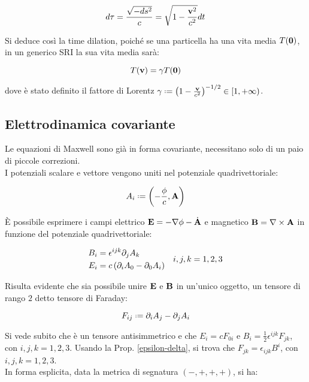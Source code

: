 \begin{equation}
	d \tau = \frac{\sqrt{-ds^2}}{c} = \sqrt{1 - \frac{\mathbf{v}^2}{c^2}} dt
	\label{eq:2.19}
\end{equation}

Si deduce così la time dilation, poiché se una particella ha una vita media $ T(\mathbf{0}) $, in un generico SRI la sua vita media sarà:

\begin{equation}
	T(\mathbf{v}) = \gamma T(\mathbf{0})
	\label{eq:2.20}
\end{equation}

dove è stato definito il fattore di Lorentz $ \gamma \defeq \left(1 - \frac{\ve{v}}{c^2}\right)^{-1/2} \in [1, +\infty) $.

\subsection{Elettrodinamica covariante}

Le equazioni di Maxwell sono già in forma covariante, necessitano solo di un paio di piccole correzioni.\\
I potenziali scalare e vettore vengono uniti nel potenziale quadrivettoriale:

\begin{equation}
	A_i \defeq \left(-\frac{\phi}{c}, \ve{A}\right)
	\label{eq:2.21}
\end{equation}

È possibile esprimere i campi elettrico $ \mathbf{E} = - \nabla \phi - \dot{\mathbf{A}} $ e magnetico $ \mathbf{B} = \nabla\times\mathbf{A} $ in funzione del potenziale quadrivettoriale:

\begin{equation}
	\begin{split}
		B_i &= \epsilon^{ijk} \partial_j A_k\\
		E_i &= c \left(\partial_i A_0 - \partial_0 A_i\right)
	\end{split}
	\quad i,j,k = 1,2,3
	\label{eq:2.22}
\end{equation}

Risulta evidente che sia possibile unire $ \mathbf{E} $ e $ \mathbf{B} $ in un'unico oggetto, un tensore di rango $ 2 $ detto tensore di Faraday:

\begin{equation}
	F_{ij} \defeq \pa_i A_j - \pa_j A_i
	\label{eq:2.23}
\end{equation}

Si vede subito che è un tensore antisimmetrico e che $ E_i = c F_{0i} $ e $ B_i = \frac{1}{2} \epsilon^{ijk} F_{jk} $, con $ i,j,k = 1,2,3 $. Usando la Prop. \ref{epsilon-delta}, si trova che $ F_{jk} = \epsilon_{ijk} B^i $, con $ i,j,k = 1,2,3 $.\\
In forma esplicita, data la metrica di segnatura $ (-,+,+,+) $, si ha:

